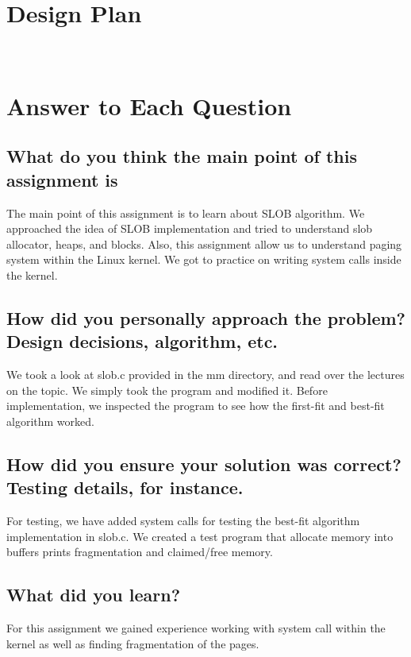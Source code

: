 \documentclass[onecolumn, draftclsnofoot,10pt, compsoc]{IEEEtran}
\begin{document}
\section{Design Plan}
\noindent
\\

\section{Answer to Each Question }
\subsection{What do you think the main point of this assignment is}
\noindent The main point of this assignment is to learn about SLOB algorithm. We approached the idea of SLOB implementation and tried to understand slob allocator, heaps, and blocks. Also, this assignment allow us to understand paging system within the Linux kernel. We got to practice on writing system calls inside the kernel. \\

\subsection{How did you personally approach the problem? Design decisions, algorithm, etc.}
\noindent We took a look at slob.c provided in the mm directory, and read over the lectures on the topic. We simply took the program and modified it. Before implementation, we inspected the program to see how the first-fit and best-fit algorithm worked. \\

\subsection{How did you ensure your solution was correct? Testing details, for instance.}
\noindent For testing, we have added system calls for testing the best-fit algorithm implementation in slob.c. We created a test program that allocate memory into buffers prints fragmentation and claimed/free memory.    
\\

\subsection{What did you learn?}
\noindent For this assignment we gained experience working with system call within the kernel as well as finding fragmentation of the pages.  
\\
\end{document}
